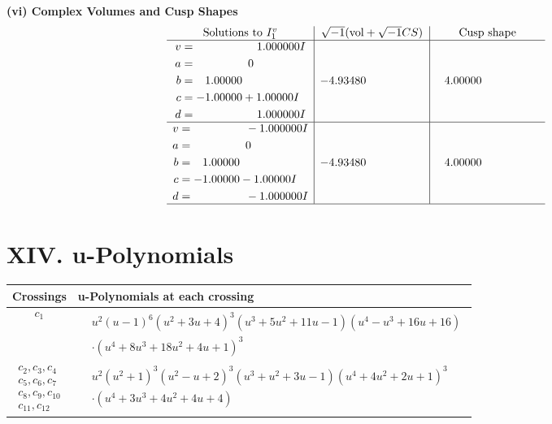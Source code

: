 \documentclass[1p]{elsarticle_modified}
\theoremstyle{definition}
\newcommand{\I}{\sqrt{-1}}
\begin{document}
\newpage\flushleft \textbf{(vi) Complex Volumes and Cusp Shapes}
$$\begin{array}{c|c|c}  
\text{Solutions to }I^v_{1}& \I (\text{vol} + \sqrt{-1}CS) & \text{Cusp shape}\\
 \hline 
\begin{aligned}
v &= \phantom{-0.000000 -}1.000000 I \\
a &= \phantom{-0.000000 } 0 \\
b &= \phantom{-}1.00000\phantom{ +0.000000I} \\
c &= -1.00000 + 1.00000 I \\
d &= \phantom{-0.000000 -}1.000000 I\end{aligned}
 & -4.93480\phantom{ +0.000000I} & \phantom{-}4.00000\phantom{ +0.000000I} \\ \hline\begin{aligned}
v &= \phantom{-0.000000 } -1.000000 I \\
a &= \phantom{-0.000000 } 0 \\
b &= \phantom{-}1.00000\phantom{ +0.000000I} \\
c &= -1.00000 - 1.00000 I \\
d &= \phantom{-0.000000 } -1.000000 I\end{aligned}
 & -4.93480\phantom{ +0.000000I} & \phantom{-}4.00000\phantom{ +0.000000I}\\
 \hline 
 \end{array}$$\newpage
\newpage\renewcommand{\arraystretch}{1}
\centering \section*{ XIV. u-Polynomials}
\begin{tabular}{m{50pt}|m{274pt}}
Crossings & \hspace{64pt}u-Polynomials at each crossing \\
\hline $$\begin{aligned}c_{1}\end{aligned}$$&$\begin{aligned}
&u^2(u-1)^6(u^2+3 u+4)^3(u^3+5 u^2+11 u-1)(u^4- u^3+16 u+16)\\
&\cdot(u^4+8 u^3+18 u^2+4 u+1)^3
\end{aligned}$\\
\hline $$\begin{aligned}c_{2},c_{3},c_{4}\\c_{5},c_{6},c_{7}\\c_{8},c_{9},c_{10}\\c_{11},c_{12}\end{aligned}$$&$\begin{aligned}
&u^2(u^2+1)^3(u^2- u+2)^3(u^3+u^2+3 u-1)(u^4+4 u^2+2 u+1)^3\\
&\cdot(u^4+3 u^3+4 u^2+4 u+4)
\end{aligned}$\\
\hline
\end{tabular}\newpage\renewcommand{\arraystretch}{1}
\end{document}
